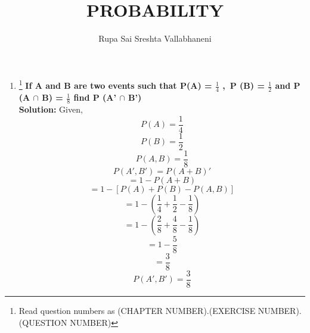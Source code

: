 \documentclass{article}
\begin{document}
\title{PROBABILITY}
\author{\Large Rupa Sai Sreshta Vallabhaneni}
\date{}

\maketitle
\begin{enumerate}[label=13.\arabic{enumi}.\arabic{enumii}]%
\setcounter{enumi}{1}
\setcounter{enumii}{9}

\item \footnote{Read question numbers as (CHAPTER NUMBER).(EXERCISE NUMBER).(QUESTION NUMBER)}\textbf { If A and B are two events such that P(A) = $\frac{1}{4}$ ,\ P (B) = $\frac{1}{2}$ and  P (A $\cap$ B) = $\frac{1}{8}$ find P (A' $\cap$ B')}\\[1ex]

\textbf{Solution:}
Given,\\
 \begin{equation}
 P(A)=\frac{1}{4}
 \end{equation}
 \begin{equation}
 P(B)=\frac{1}{2}
 \end{equation}
 \begin{equation}
 P (A , B) = \frac{1}{8}
 \end{equation}
 \begin{equation}
P(A'  , B')=P(A+B)'
 \end{equation}
 \begin{equation}
 = 1-P(A + B)
 \end{equation}
 \begin{equation}
 = 1-[P(A)+P(B)-P(A,B)]
 \end{equation}
 \begin{equation}
 = 1-\left( \frac{1}{4}+\frac{1}{2}-\frac{1}{8}\right)
 \end{equation}
 \begin{equation}
 = 1-\left( \frac{2}{8}+\frac{4}{8}-\frac{1}{8}\right)
 \end{equation}
 \begin{equation}
 = 1-\frac{5}{8}
 \end{equation}
 \begin{equation}
 = \frac{3}{8}
 \end{equation}
\begin{equation}
 \boxed{P( A' , B')= \frac{3}{8}}
 \end{equation}


\end{enumerate}
\end{document}
